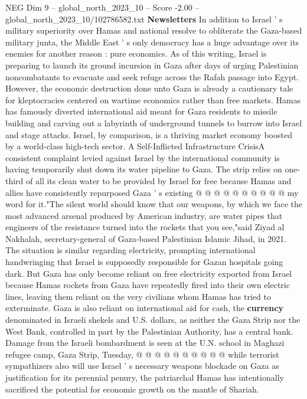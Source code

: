 \begin{textsample}{NEG Dim 9 – global\_north\_2023\_10 – Score -2.00 – global\_north\_2023\_10/102786582.txt}  \label{ex:f9_neg_152}
\textbf{Newsletters} In addition to Israel ' s military superiority over Hamas and national resolve to obliterate the Gaza-based military junta, the Middle East ' s only democracy has a huge advantage over its enemies for another reason : pure economics.
As of this writing, Israel is preparing to launch its ground incursion in Gaza after days of urging Palestinian noncombatants to evacuate and seek refuge across the Rafah passage into Egypt.
However, the economic destruction done unto Gaza is already a cautionary tale for kleptocracies centered on wartime economics rather than free markets.
Hamas has famously diverted international aid meant for Gaza residents to missile building and carving out a labyrinth of underground tunnels to burrow into Israel and stage attacks.
Israel, by comparison, is a thriving market economy boosted by a world-class high-tech sector.
A Self-Inflicted Infrastructure CrisisA consistent complaint levied against Israel by the international community is having temporarily shut down its water pipeline to Gaza.
The strip relies on one-third of all its clean water to be provided by Israel for free because Hamas and allies have consistently repurposed Gaza ' s existing @ @ @ @ @ @ @ @ @ @ my word for it."The silent world should know that our weapons, by which we face the most advanced arsenal produced by American industry, are water pipes that engineers of the resistance turned into the rockets that you see,"said Ziyad al Nakhalah, secretary-general of Gaza-based Palestinian Islamic Jihad, in 2021.
The situation is similar regarding electricity, prompting international handwringing that Israel is supposedly responsible for Gazan hospitals going dark.
But Gaza has only become reliant on free electricity exported from Israel because Hamas rockets from Gaza have repeatedly fired into their own electric lines, leaving them reliant on the very civilians whom Hamas has tried to exterminate.
Gaza is also reliant on international aid for cash, the \textbf{currency} denominated in Israeli shekels and U.S. dollars, as neither the Gaza Strip nor the West Bank, controlled in part by the Palestinian Authority, has a central bank.
Damage from the Israeli bombardment is seen at the U.N. school in Maghazi refugee camp, Gaza Strip, Tuesday, @ @ @ @ @ @ @ @ @ @ while terrorist sympathizers also will use Israel ' s necessary weapons blockade on Gaza as justification for its perennial penury, the patriarchal Hamas has intentionally sacrificed the potential for economic growth on the mantle of Shariah.

\end{textsample}
